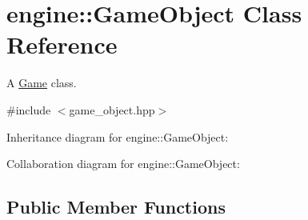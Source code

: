 \hypertarget{classengine_1_1_game_object}{}\section{engine\+:\+:Game\+Object Class Reference}
\label{classengine_1_1_game_object}


A \hyperlink{classengine_1_1_game}{Game} class.  




{\ttfamily \#include $<$game\+\_\+object.\+hpp$>$}



Inheritance diagram for engine\+:\+:Game\+Object\+:


Collaboration diagram for engine\+:\+:Game\+Object\+:
\subsection*{Public Member Functions}
